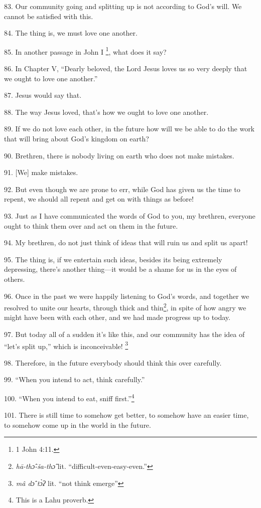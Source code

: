 83. Our community going and splitting up is not according to God's will. We cannot
be satisfied with this.

84. The thing is, we must love one another.

85. In another passage in John I \footnote{1 John 4:11.}, what does it say?

86. In Chapter V, ``Dearly beloved, the Lord Jesus loves us so very deeply that
we ought to love one another.''

87. Jesus would say that.

88. The way Jesus loved, that's how we ought to love one another.

89. If we do not love each other, in the future how will we be able to do the work
that will bring about God's kingdom on earth?

90. Brethren, there is nobody living on earth who does not make mistakes.

91. [We] make mistakes.

92. But even though we are prone to err, while God has given us the time to repent,
we should all repent and get on with things as before!

93. Just as I have communicated the words of God to you, my brethren, everyone
ought to think them over and act on them in the future.

94. My brethren, do not just think of ideas that will ruin us and split us apart!

95. The thing is, if we entertain such ideas, besides its being extremely depressing,
there's another thing---it would be a shame for us in the eyes of others.

96. Once in the past we were happily listening to God's words, and together we
resolved to unite our hearts, through thick and thin\footnote{\textit{hā-thɔ̂-ša-thɔ̂} lit. ``difficult-even-easy-even.''}, in spite of how angry
we might have been with each other, and we had made progress up to today.

97. But today all of a sudden it's like this, and our community has the idea of
``let's split up,'' which is inconceivable! \footnote{\textit{mâ dɔ̂ tɔ̀ʔ} lit. ``not think emerge''}

98. Therefore, in the future everybody should think this over carefully.

99. ``When you intend to act, think carefully.''

100. ``When you intend to eat, sniff first.''\footnote{This is a Lahu proverb.}

101. There is still time to somehow get better, to somehow have an easier time,
to somehow come up in the world in the future.


